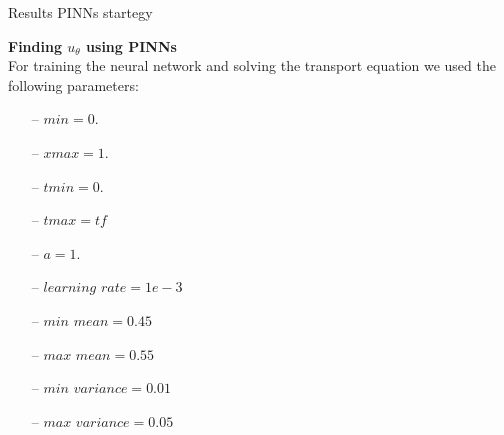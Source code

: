 \begin{frame}{Results PINNs startegy}

    \textbf{{Finding $u_\theta$ using PINNs}}\\

    \vspace{0.3cm}
    For training the neural network and solving the transport equation we used the following parameters:
    \begin{itemize}
        \item[--] $min = 0.$
        \item[--] $xmax = 1.$
        \item[--] $tmin = 0.$
        \item[--] $tmax = tf$
        \item[--] $a = 1.$
        \item[--] $learning$ $rate = 1e-3$
        \item[--] $min$ $mean = 0.45$
        \item[--] $max$ $mean = 0.55$
        \item[--] $min$ $variance = 0.01$
        \item[--] $max$ $variance = 0.05$
    \end{itemize}
   
\end{frame}
